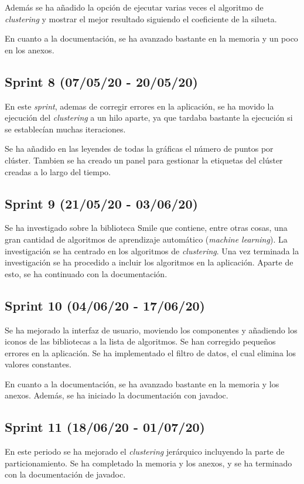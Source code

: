 Además se ha añadido la opción de ejecutar varias veces el algoritmo de \emph{clustering} y mostrar el mejor resultado siguiendo el coeficiente de la silueta.

En cuanto a la documentación, se ha avanzado bastante en la memoria y un poco en los anexos.

\subsection{Sprint 8 (07/05/20 - 20/05/20)}
En este \emph{sprint}, ademas de corregir errores en la aplicación, se ha movido la ejecución del \emph{clustering} a un hilo aparte, ya que tardaba bastante la ejecución si se establecían muchas iteraciones.

Se ha añadido en las leyendes de todas la gráficas el número de puntos por clúster. Tambien se ha creado un panel para gestionar la etiquetas del clúster creadas a lo largo del tiempo.

\subsection{Sprint 9 (21/05/20 - 03/06/20)}
Se ha investigado sobre la biblioteca Smile que contiene, entre otras cosas, una gran cantidad de algoritmos de aprendizaje automático (\emph{machine learning}). La investigación se ha centrado en los algoritmos de \emph{clustering}. Una vez terminada la investigación se ha procedido a incluir los algoritmos en la aplicación. Aparte de esto, se ha continuado con la documentación.

\subsection{Sprint 10 (04/06/20 - 17/06/20)}
Se ha mejorado la interfaz de usuario, moviendo los componentes y añadiendo los iconos de las bibliotecas a la lista de algoritmos. Se han corregido pequeños errores en la aplicación. Se ha implementado el filtro de datos, el cual elimina los valores constantes.

En cuanto a la documentación, se ha avanzado bastante en la memoria y los anexos. Además, se ha iniciado la documentación con javadoc.

\subsection{Sprint 11 (18/06/20 - 01/07/20)}
En este periodo se ha mejorado el \emph{clustering} jerárquico incluyendo la parte de particionamiento. Se ha completado la memoria y los anexos, y se ha terminado con la documentación de javadoc.

